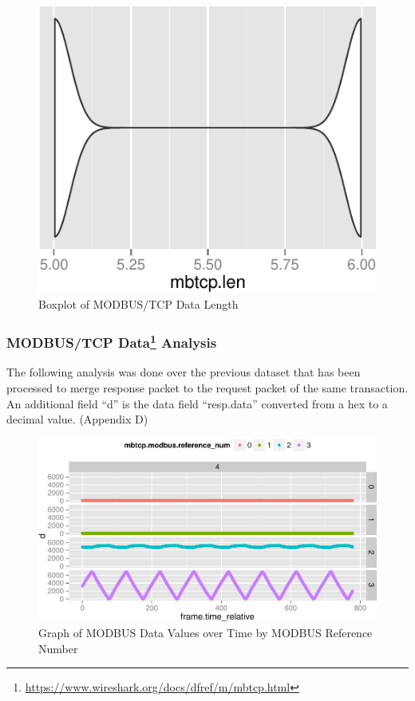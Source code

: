 \documentclass[12pt,]{article}
\let\rmarkdownfootnote\footnote%
\def\footnote{\protect\rmarkdownfootnote}
\begin{document}
\begin{figure}

{\centering \includegraphics{thesis_files/figure-latex/unnamed-chunk-25-1} 

}

\caption{Boxplot of MODBUS/TCP Data Length}\label{fig:unnamed-chunk-25}
\end{figure}

\clearpage

\subsubsection[MODBUS/TCP Data Analysis]{MODBUS/TCP Data\footnote{\url{https://www.wireshark.org/docs/dfref/m/mbtcp.html}}
Analysis}\label{modbustcp-data9-analysis}

The following analysis was done over the previous dataset that has been
processed to merge response packet to the request packet of the same
transaction. An additional field ``d'' is the data field ``resp.data''
converted from a hex to a decimal value. (Appendix D)

\begin{figure}

{\centering \includegraphics{thesis_files/figure-latex/unnamed-chunk-26-1} 

}

\caption{Graph of MODBUS Data Values over Time by MODBUS  Reference Number}\label{fig:unnamed-chunk-26}
\end{figure}
\end{document}
